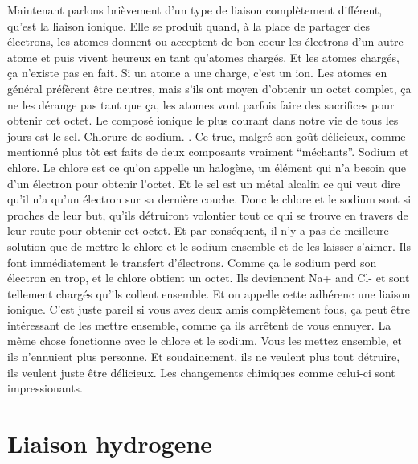 Maintenant parlons brièvement d'un type de liaison complètement
différent, qu'est la liaison ionique. Elle se produit quand, à la place
de partager des électrons, les atomes donnent ou acceptent de bon coeur
les électrons d'un autre atome et puis vivent heureux en tant qu'atomes
chargés. Et les atomes chargés, ça n'existe pas en fait. Si un atome a
une charge, c'est un ion. Les atomes en général préfèrent être neutres,
mais s'ils ont moyen d'obtenir un octet complet, ça ne les dérange pas
tant que ça, les atomes vont parfois faire des sacrifices pour obtenir
cet octet. Le composé ionique le plus courant dans notre vie de tous les
jours est le sel. Chlorure de sodium. . Ce truc,
malgré son goût délicieux, comme mentionné plus tôt est faits de deux
composants vraiment ``méchants''. Sodium et chlore. Le chlore est ce
qu'on appelle un halogène, un élément qui n'a besoin que d'un électron
pour obtenir l'octet. Et le sel est un métal alcalin ce qui veut dire
qu'il n'a qu'un électron sur sa dernière couche. Donc le chlore et le
sodium sont si proches de leur but, qu'ils détruiront volontier tout ce
qui se trouve en travers de leur route pour obtenir cet octet. Et par
conséquent, il n'y a pas de meilleure solution que de mettre le chlore
et le sodium ensemble et de les laisser s'aimer. Ils font immédiatement
le transfert d'électrons. Comme ça le sodium perd son électron en trop,
et le chlore obtient un octet. Ils deviennent Na+ and Cl- et sont
tellement chargés qu'ils collent ensemble. Et on appelle cette adhérenc
une liaison ionique. C'est juste pareil si vous avez deux amis
complètement fous, ça peut être intéressant de les mettre ensemble,
comme ça ils arrêtent de vous ennuyer. La même chose fonctionne avec le
chlore et le sodium. Vous les mettez ensemble, et ils n'ennuient plus
personne. Et soudainement, ils ne veulent plus tout détruire, ils
veulent juste être délicieux. Les changements chimiques comme celui-ci
sont impressionants.

\hypertarget{liaison-hydrogene}{%
\section{Liaison hydrogene}\label{liaison-hydrogene}}

